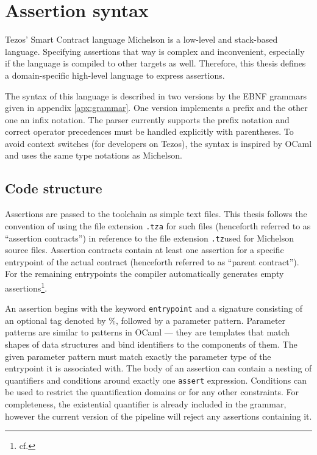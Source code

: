 \section{Assertion syntax}\label{sec:syntax}
Tezos' Smart Contract language Michelson is a low-level and stack-based language. Specifying assertions that way is complex and inconvenient, especially if the language is compiled to other targets as well. Therefore, this thesis defines a domain-specific high-level language to express assertions. 

The syntax of this language is described in two versions by the EBNF grammars given in appendix \ref{apx:grammar}. One version implements a prefix and the other one an infix notation. The parser currently supports the prefix notation and correct operator precedences must be handled explicitly with parentheses. To avoid context switches (for developers on Tezos), the syntax is inspired by OCaml \cite{ocaml_docs} and uses the same type notations as Michelson.

\subsection{Code structure}
Assertions are passed to the toolchain as simple text files. This thesis follows the convention of using the file extension \texttt{.tza} for such files (henceforth referred to as ``assertion contracts'') in reference to the file extension \texttt{.tz}used for Michelson source files. Assertion contracts contain at least one assertion for a specific entrypoint of the actual contract (henceforth referred to as ``parent contract''). For the remaining entrypoints the compiler automatically generates empty assertions\footnote{cf. }.

An assertion begins with the keyword \texttt{entrypoint} and a signature consisting of an optional tag denoted by \%, followed by a parameter pattern. Parameter patterns are similar to patterns in OCaml --- they are templates that match shapes of data structures and bind identifiers to the components of them. The given parameter pattern must match exactly the parameter type of the entrypoint it is associated with. The body of an assertion can contain a nesting of quantifiers and conditions around exactly one \texttt{assert} expression. Conditions can be used to restrict the quantification domains or for any other constraints. For completeness, the existential quantifier is already included in the grammar, however the current version of the pipeline will reject any assertions containing it. 

